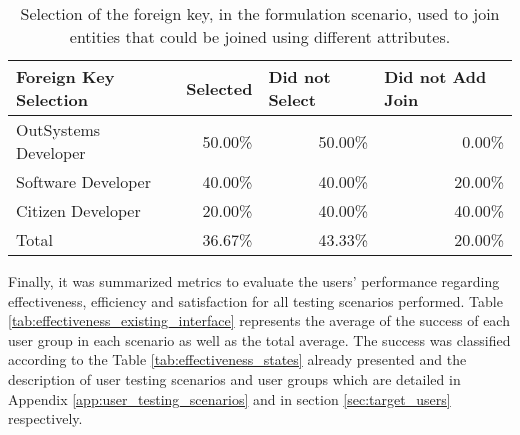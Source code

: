 \begin{table}[tb]
    \caption{Selection of the foreign key, in the formulation scenario, used to join entities that could be joined using different attributes.}
    \label{tab:existingInterfaceForeignKeySelection}
    \begin{tabular}{@{}lrrr@{}}
    \toprule
    \textbf{Foreign Key Selection} & \multicolumn{1}{l}{Selected} & \multicolumn{1}{l}{Did not Select} & \multicolumn{1}{l}{Did not Add Join} \\ \midrule
    OutSystems Developer           & 50.00\%                      & 50.00\%                            & 0.00\%                               \\
    Software Developer             & 40.00\%                      & 40.00\%                            & 20.00\%                              \\
    Citizen Developer              & 20.00\%                      & 40.00\%                            & 40.00\%                              \\
    Total                          & 36.67\%                      & 43.33\%                            & 20.00\%                              \\ \bottomrule
    \end{tabular}
    \end{table}

Finally, it was summarized metrics to evaluate the users' performance regarding effectiveness, efficiency and satisfaction for all testing scenarios performed. Table \ref{tab:effectiveness_existing_interface} represents the average of the success of each user group in each scenario as well as the total average. The success was classified according to the Table \ref{tab:effectiveness_states} already presented and the description of user testing scenarios and user groups which are detailed in Appendix \ref{app:user_testing_scenarios} and in section \ref{sec:target_users} respectively.

